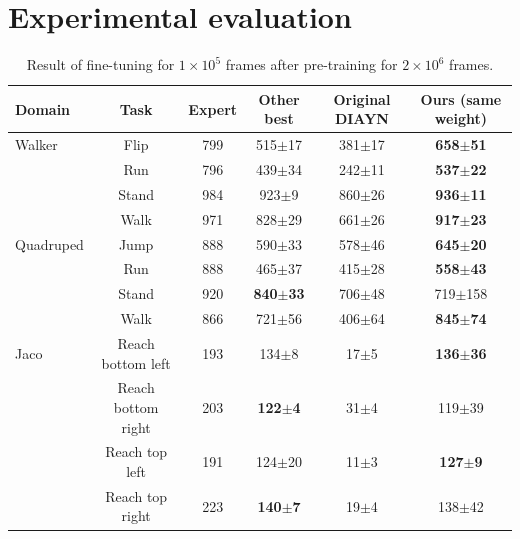 \section{Experimental evaluation}

\begin{table}[t]
 \caption{Result of fine-tuning for $1 \times 10^5$ frames after pre-training for $2 \times 10^6$ frames.}
 \label{table:result_urlb}
 \vskip 0.15in
 \begin{center}
 \begin{small}
 \begin{sc}
 \begin{tabular}{lccccc}
 \toprule
 Domain & Task & Expert & Other best & Original DIAYN & Ours (same weight) \\
 \midrule
 Walker & Flip  & 799  & 515$\pm$17 &  381$\pm$17   & \textbf{658$\pm$51}\\
        & Run   & 796  & 439$\pm$34 &  242$\pm$11   & \textbf{537$\pm$22}\\
        & Stand & 984  & 923$\pm$9  &  860$\pm$26   & \textbf{936$\pm$11} \\
        & Walk  & 971  & 828$\pm$29 &  661$\pm$26   & \textbf{917$\pm$23}\\
 Quadruped & Jump  & 888  & 590$\pm$33  &  578$\pm$46  & \textbf{645$\pm$20} \\
        & Run   & 888     & 465$\pm$37  &  415$\pm$28  & \textbf{558$\pm$43} \\
        & Stand & 920     & \textbf{840$\pm$33}  &  706$\pm$48  & 719$\pm$158 \\
        & Walk  & 866     & 721$\pm$56  &  406$\pm$64  & \textbf{845$\pm$74}  \\
 Jaco & Reach bottom left   & 193 & 134$\pm$8 & 17$\pm$5   & \textbf{136$\pm$36}\\
        & Reach bottom right& 203 & \textbf{122$\pm$4} & 31$\pm$4   & 119$\pm$39\\
        & Reach top left    & 191 & 124$\pm$20 & 11$\pm$3   & \textbf{127$\pm$9}\\
        & Reach top right   & 223 & \textbf{140$\pm$7}  & 19$\pm$4   & 138$\pm$42\\
 \bottomrule
 \end{tabular}
 \end{sc}
 \end{small}
 \end{center}
 \vskip -0.1in
 \end{table}

